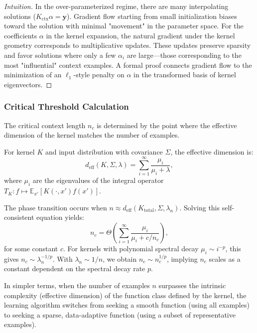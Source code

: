 	\begin{proof}[Intuition]
		In the over-parameterized regime, there are many interpolating solutions ($K_{\text{ctx}} \alpha = \mathbf{y}$). Gradient flow starting from small initialization biases toward the solution with minimal "movement" in the parameter space. For the coefficients $\alpha$ in the kernel expansion, the natural gradient under the kernel geometry corresponds to multiplicative updates. These updates preserve sparsity and favor solutions where only a few $\alpha_i$ are large—those corresponding to the most "influential" context examples. A formal proof connects gradient flow to the minimization of an $\ell_1$-style penalty on $\alpha$ in the transformed basis of kernel eigenvectors.
	\end{proof}
	
	\subsubsection{Critical Threshold Calculation}
	\label{subsubsec:critical_threshold}
	
	The critical context length $n_c$ is determined by the point where the effective dimension of the kernel matches the number of examples.
	
	\begin{definition}
		For kernel $K$ and input distribution with covariance $\Sigma$, the effective dimension is:
		\[
		d_{\text{eff}}(K, \Sigma, \lambda) = \sum_{i=1}^{\infty} \frac{\mu_i}{\mu_i + \lambda},
		\]
		where $\mu_i$ are the eigenvalues of the integral operator $T_K: f \mapsto \mathbb{E}_{x'}[K(\cdot, x') f(x')]$.
	\end{definition}
	
	\begin{lemma}
		\label{lem:critical_threshold}
		The phase transition occurs when $n \approx d_{\text{eff}}(K_{\text{total}}, \Sigma, \lambda_n)$. Solving this self-consistent equation yields:
		\[
		n_c = \Theta\left( \sum_{i=1}^{\infty} \frac{\mu_i}{\mu_i + c/n_c} \right),
		\]
		for some constant $c$. For kernels with polynomial spectral decay $\mu_i \sim i^{-p}$, this gives $n_c \sim \lambda_n^{-1/p}$. With $\lambda_n \sim 1/n$, we obtain $n_c \sim n_c^{1/p}$, implying $n_c$ scales as a constant dependent on the spectral decay rate $p$.
	\end{lemma}
	
	In simpler terms, when the number of examples $n$ surpasses the intrinsic complexity (effective dimension) of the function class defined by the kernel, the learning algorithm switches from seeking a smooth function (using all examples) to seeking a sparse, data-adaptive function (using a subset of representative examples).
	
